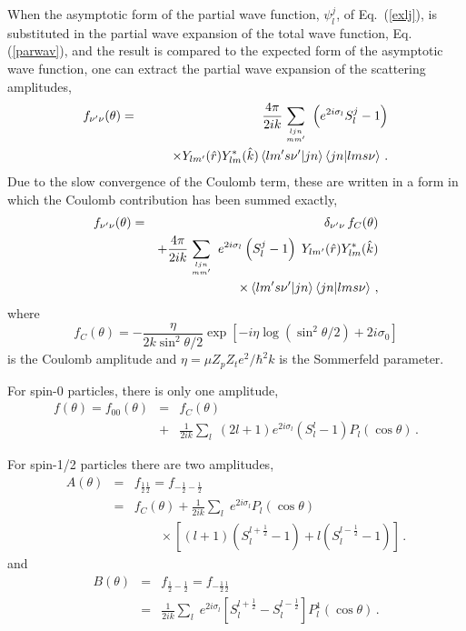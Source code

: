 \documentclass[twocolumn,amsmath,amssymb,10pt,groupedaddress,a4paper]{revtex4}
\begin{document}
When the asymptotic form of the partial wave function, $\psi_{l}^{j}$,
of Eq.~(\ref{exlj}), is substituted in the partial wave expansion
of the total wave function, Eq. (\ref{parwav}), and the result is
compared to the expected form of the asymptotic wave function,
one can extract the partial wave expansion of the scattering amplitudes,
\begin{eqnarray}
f_{\nu^{\prime}\nu}(\theta) & = & \frac{4\pi}{2ik}\sum_{{{ljn\atop mm^{\prime}}}}\;\left(e^{2i\sigma_{l}}S_{l}^{j}-1\right)\\
 &  & \qquad\times Y_{lm^{\prime}}(\hat{r})Y_{lm}^{*}(\hat{k})\left\langle lm^{\prime}s\nu^{\prime}|jn\right\rangle \left\langle jn|lms\nu\right\rangle \,.\nonumber\end{eqnarray}
 Due to the slow convergence of the Coulomb term, these are written
in a form in which the Coulomb contribution has been summed exactly,\begin{eqnarray}
f_{\nu^{\prime}\nu}(\theta) & = & \delta_{\nu^{\prime}\nu}\,
 f_{C}(\theta) \\
& & +\frac{4\pi}{2ik}\sum_{{{ljn\atop mm^{\prime}}}}\; e^{2i\sigma_{l}}\left(S_{l}^{j}-1\right)\; Y_{lm^{\prime}}(\hat{r})Y_{lm}^{*}(\hat{k})\nonumber \\
 &  & \qquad\qquad\times\left\langle
 lm^{\prime}s\nu^{\prime}|jn\right\rangle \left\langle
 jn|lms\nu\right\rangle \,,\nonumber \end{eqnarray}
 where \begin{equation}
f_{C}(\theta)=-\frac{\eta}{2k\sin^{2}\theta/2}\exp\left[-i\eta\log\left(\sin^{2}\theta/2\right)+2i\sigma_{0}\right]\end{equation}
 is the Coulomb amplitude and $\eta=\mu Z_p Z_t e^2/\hbar^2 k $ is the
 Sommerfeld parameter.

For spin-0 particles, there is only one amplitude, \begin{eqnarray}
f(\theta)=f_{00}(\theta) & = & f_{C}(\theta)\\
 & + & \frac{1}{2ik}\sum_{l}\;(2l+1)e^{2i\sigma_{l}}(S_{l}^{l}-1)P_{l}(\cos\theta)\,.\nonumber \end{eqnarray}


For spin-1/2 particles there are two amplitudes, \begin{eqnarray}
A(\theta) & = & f_{\frac{1}{2}\frac{1}{2}}=f_{-\frac{1}{2}-\frac{1}{2}}\\
 & = & f_{C}(\theta)+\frac{1}{2ik}\sum_{l}\; e^{2i\sigma_{l}}P_{l}(\cos\theta)\nonumber \\
 &  & \qquad\times\left[(l+1)(S_{l}^{l+\frac{1}{2}}-1)+l(S_{l}^{l-\frac{1}{2}}-1)\right]\,.\nonumber\end{eqnarray}
 and \begin{eqnarray}
B(\theta) & = & f_{\frac{1}{2}-\frac{1}{2}}=f_{-\frac{1}{2}\frac{1}{2}}\\
 & = & \frac{1}{2ik}\sum_{l}\; e^{2i\sigma_{l}}\left[S_{l}^{l+\frac{1}{2}}-S_{l}^{l-\frac{1}{2}}\right]P_{l}^{1}(\cos\theta)\,.\nonumber \end{eqnarray}
\end{document}

